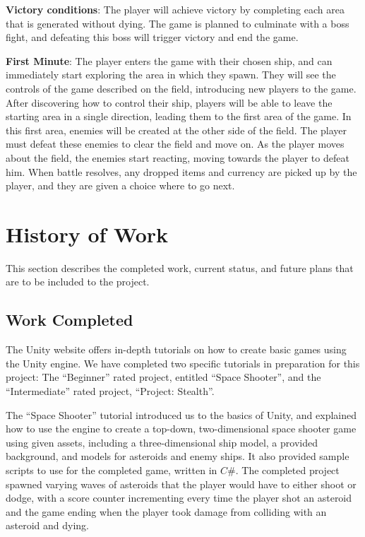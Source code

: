 \documentclass[12pt]{article}       %
\def\hs{\hspace{15pt}}
\begin{document}
{\bf Victory conditions}: The player will achieve victory by completing each area that is generated without dying. The game is planned to culminate with a boss fight, and defeating this boss will trigger victory and end the game.

{\bf First Minute}: The player enters the game with their chosen ship, and can immediately start exploring the area in which they spawn. They will see the controls of the game described on the field, introducing new players to the game. After discovering how to control their ship, players will be able to leave the starting area in a single direction, leading them to the first area of the game. In this first area, enemies will be created at the other side of the field. The player must defeat these enemies to clear the field and move on. As the player moves about the field, the enemies start reacting, moving towards the player to defeat him. When battle resolves, any dropped items and currency are picked up by the player, and they are given a choice where to go next.

\section{History of Work}
\label{sec:history}
This section describes the completed work, current status, and future plans that are to be included to the project.

\subsection{Work Completed}

\hs The Unity website offers in-depth tutorials on how to create basic games using the Unity engine. We have completed two specific tutorials in preparation for this project: The “Beginner” rated project, entitled “Space Shooter”, and the “Intermediate” rated project, “Project: Stealth”.

  The “Space Shooter” tutorial introduced us to the basics of Unity, and explained how to use the engine to create a top-down, two-dimensional space shooter game using given assets, including a three-dimensional ship model, a provided background, and models for asteroids and enemy ships. It also provided sample scripts to use for the completed game, written in $C\#$. The completed project spawned varying waves of asteroids that the player would have to either shoot or dodge, with a score counter incrementing every time the player shot an asteroid and the game ending when the player took damage from colliding with an asteroid and dying.
\end{document}
